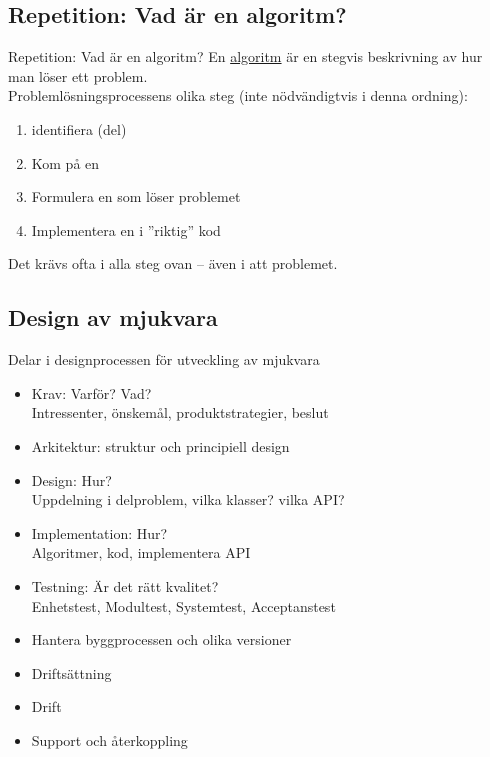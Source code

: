\documentclass{lecturenotes}
\begin{document}
\subsection{Repetition: Vad är en algoritm?}
\begin{Slide}{Repetition: Vad är en algoritm? }\footnotesize
En \href{https://sv.wikipedia.org/wiki/Algoritm}{algoritm} är en stegvis beskrivning av hur man löser ett problem. \\ 
\vspace{1em}
Problemlösningsprocessens olika steg (inte nödvändigtvis i denna ordning): 
\begin{enumerate}
\item identifiera (del)
\item Kom på en 
\item Formulera en  som löser problemet
\item Implementera en  i ''riktig'' kod
\end{enumerate}
Det krävs ofta  i alla steg ovan  -- även i att  problemet.
\end{Slide}

\subsection{Design av mjukvara}
\begin{Slide}{Delar i designprocessen för utveckling av mjukvara}
\begin{itemize}
\item Krav: Varför? Vad? \\ Intressenter, önskemål, produktstrategier, beslut
\item Arkitektur: struktur och principiell design
\item Design: Hur? \\ Uppdelning i delproblem, vilka klasser? vilka API?
\item Implementation: Hur? \\ 
Algoritmer, kod, implementera API
\item Testning: Är det rätt kvalitet? \\ Enhetstest, Modultest, Systemtest, Acceptanstest
\item Hantera byggprocessen och olika versioner
\item Driftsättning  
\item Drift 
\item Support och återkoppling
\end{itemize}
\end{Slide}
\end{document}
